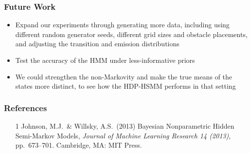 \documentclass{beamer}
\begin{document}
\begin{frame}
	\frametitle{Future Work}
		\begin{itemize}
			\item Expand our experiments through generating more data, including using different random generator seeds, different grid sizes and obstacle placements, and adjusting the transition and emission distributions
			\item Test the accuracy of the HMM under less-informative priors
			\item We could strengthen the non-Markovity and make the true means of the states more distinct, to see how the HDP-HSMM performs in that setting
		\end{itemize}
\end{frame}


\begin{frame}
    \frametitle{References}
    \begin{itemize}
        \item [1] Johnson, M.J.\ \& Willsky, A.S.\ (2013) Bayesian Nonparametric Hidden Semi-Markov Models, {\it Journal of Machine Learning Research 14 (2013)},
        pp.\ 673--701. Cambridge, MA: MIT Press.
    \end{itemize}
\end{frame}
\end{document}
